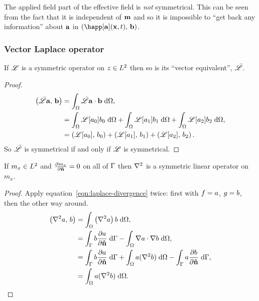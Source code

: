 The applied field part of the effective field is \emph{not} symmetrical.
This can be seen from the fact that it is independent of $\mv$ and so it is impossible to ``get back any information'' about $\av$ in $\ip{\happ[\av](\xv, t)}{\bv}$.

\subsubsection{Vector Laplace operator}

\begin{theorem}
  If $\lop$ is a symmetric operator on $z \in \ltwo$ then so is its ``vector equivalent'', $\bar{\lop}$.
\end{theorem}

\begin{proof}
  \begin{equation}
    \begin{aligned}
      \ip{\bar{\lop}\av}{\bv} &= \intd{ \bar{\lop} \av \cdot \bv}, \\
      &= \intd{\lop[a_0] b_0} + \intd{\lop[a_1] b_1} + \intd{\lop[a_2] b_2}, \\
      & = \ip{\lop[a_0]}{b_0} + \ip{\lop[a_1]}{b_1} + \ip{\lop[a_2]}{b_2}.
    \end{aligned}
  \end{equation}
  So $\bar{\lop}$ is symmetrical if and only if $\lop$ is symmetrical.
\end{proof}

\begin{theorem}
 If $m_x \in \ltwo$ and $\ddn{m_x} = 0$ on all of $\boundd$ then $\lap$ is a symmetric linear operator on $m_x$.
\end{theorem}
\begin{proof}
  Apply equation~\eqref{eqn:laplace-divergence} twice: first with $\ff = a$, $\gf = b$, then the other way around.
  \begin{equation}
    \begin{aligned}
      \ip{\lap a}{b} &= \intd{\left(\lap a \right) b}, \\
      &= \intb{b \ddn{a}} - \intd{\nabla a \cdot \nabla b}, \\
      &= \intb{b \ddn{a}} + \intd{a (\lap b)} - \intb{a \ddn{b}}, \\
      &= \intd{a (\lap b)}.
    \end{aligned}
  \end{equation}
\end{proof}

